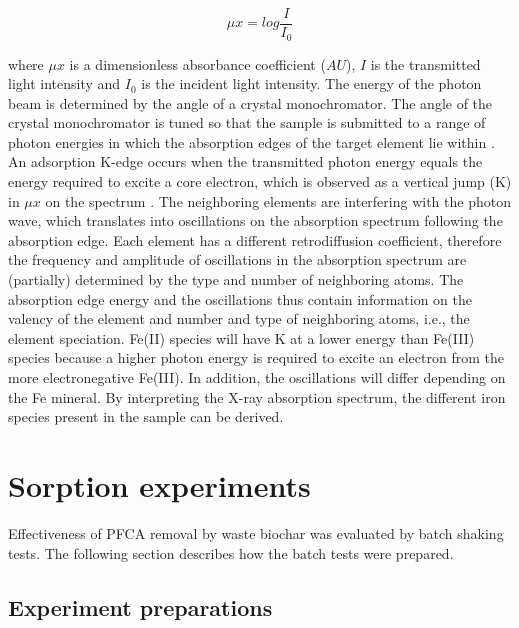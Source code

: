 \begin{equation}\label{eq:absorbance}
    \mu x = log \frac{I}{I_0}
\end{equation}

where $\mu x$ is a dimensionless absorbance coefficient ($AU$), $I$ is the transmitted light intensity and $I_0$ is the incident light intensity. The energy of the photon beam is determined by the angle of a crystal monochromator. The angle of the crystal monochromator is tuned so that the sample is submitted to a range of photon energies in which the absorption edges of the target element lie within \citep{vlaica2004exafs}. An adsorption K-edge occurs when the transmitted photon energy equals the energy required to excite a core electron, which is observed as a vertical jump (K) in $\mu x$ on the spectrum \citep{vlaica2004exafs}. The neighboring elements are interfering with the photon wave, which translates into oscillations on the absorption spectrum following the absorption edge. Each element has a different retrodiffusion coefficient, therefore the frequency and amplitude of oscillations in the absorption spectrum are (partially) determined by the type and number of neighboring atoms. The absorption edge energy and the oscillations thus contain information on the valency of the element and number and type of neighboring atoms, i.e., the element speciation. Fe(II) species will have K at a lower energy than Fe(III) species because a higher photon energy is required to excite an electron from the more electronegative Fe(III). In addition, the oscillations will differ depending on the Fe mineral. By interpreting the X-ray absorption spectrum, the different iron species present in the sample can be derived.


\section{Sorption experiments}
Effectiveness of PFCA removal by waste biochar was evaluated by batch shaking tests. The following section describes how the batch tests were prepared.

\subsection{Experiment preparations}
